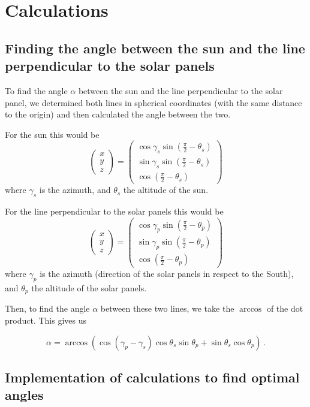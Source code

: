 \documentclass{article}
\newcommand{\vvec}[1]{\begin{pmatrix}
                          #1
\end{pmatrix}}
\begin{document}
    \section{Calculations}\label{sec:calculations}
    \subsection{Finding the angle between the sun and the line perpendicular to the solar panels}\label{subsec:findingTheAngleBetweenTheSunAndTheLinePerpendicularToTheSolarPanels}
    To find the angle $\alpha$ between the sun and the line perpendicular to the solar panel, we determined both lines in spherical coordinates (with the same distance to the origin) and then calculated the angle between the two.


    For the sun this would be
    \[
        \vvec{x \\ y \\ z} =
        \vvec{\cos \gamma_s \sin \left(\frac{\pi}{2} - \theta_s\right) \\
        \sin \gamma_s \sin \left(\frac{\pi}{2} - \theta_s\right) \\
        \cos \left(\frac{\pi}{2} - \theta_s\right)}
    \]
    where $ \gamma_s $ is the azimuth, and $ \theta_s $ the altitude of the sun.


    For the line perpendicular to the solar panels this would be
    \[
        \vvec{x \\ y \\ z} =
        \vvec{\cos \gamma_p \sin \left(\frac{\pi}{2} - \theta_p\right) \\
        \sin \gamma_p \sin \left(\frac{\pi}{2} - \theta_p\right) \\
        \cos \left(\frac{\pi}{2} - \theta_p\right)}
    \]
    where $ \gamma_p $ is the azimuth (direction of the solar panels in respect to the South), and $ \theta_p $ the altitude of the solar panels.

    Then, to find the angle $\alpha$ between these two lines, we take the $ \arccos $ of the dot product.
    This gives us

    \[
        \alpha = \arccos (\cos (\gamma_p - \gamma_s) \cos \theta_s \sin \theta_p + \sin \theta_s \cos \theta_p)\,.
    \]

    \subsection{Implementation of calculations to find optimal angles}
\end{document}
